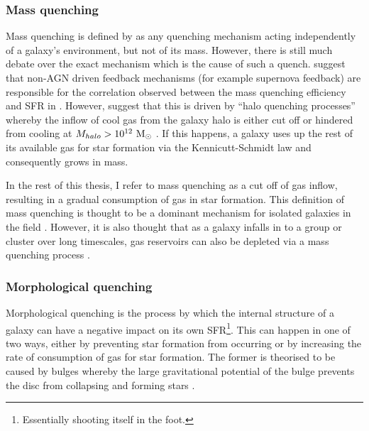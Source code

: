 \subsubsection{Mass quenching}\label{sec:massquench}

Mass quenching is defined by \citet{peng10, peng12} as any quenching mechanism acting independently of a galaxy's environment, but not of its mass. However, there is still much debate over the exact mechanism which is the cause of such a quench. \citet{darvish16} suggest that non-AGN driven feedback mechanisms (for example supernova feedback) are responsible for the correlation observed between the mass quenching efficiency and SFR in \citet{peng10}. However, \citet{gabor15} suggest that this is driven by ``halo quenching processes'' whereby the inflow of cool gas from the galaxy halo is either cut off or hindered from cooling at $M_{halo} > 10^{12}~\rm{M}_{\odot}$ \citep{birnboim03, dekel06}. If this happens, a galaxy uses up the rest of its available gas for star formation via the Kennicutt-Schmidt law \citep{schmidt59, kennicutt98} and consequently grows in mass.

In the rest of this thesis, I refer to mass quenching as a cut off of gas inflow, resulting in a gradual consumption of gas in star formation. This definition of mass quenching is thought to be a dominant mechanism for isolated galaxies in the field \citep{kormendy04}. However, it is also thought that as a galaxy infalls in to a group or cluster over long timescales, gas reservoirs can also be depleted via a mass quenching process \citep{peng12}. 

 
\subsubsection{Morphological quenching}\label{sec:morphquench}

Morphological quenching is the process by which the internal structure of a galaxy can have a negative impact on its own SFR\footnote{Essentially shooting itself in the foot.}. This can happen in one of two ways, either by preventing star formation from occurring or by increasing the rate of consumption of gas for star formation. The former is theorised to be caused by bulges \citep{bluck14} whereby the large gravitational potential of the bulge prevents the disc from collapsing and forming stars \citep{Fang13}. 

